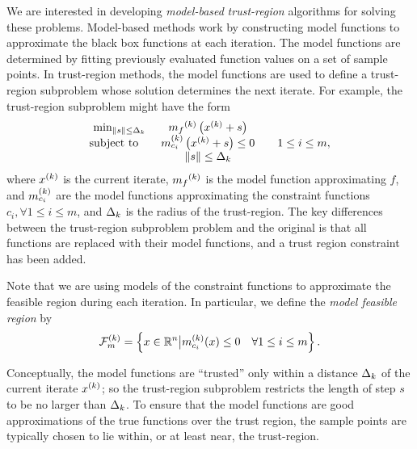 We are interested in developing {\em model-based} {\em trust-region} algorithms for solving these problems.
Model-based methods work by constructing model functions to approximate the black box functions at each iteration.
The model functions are determined by fitting previously evaluated function values on a set of sample points.
In trust-region methods, the model functions are used to define a trust-region subproblem whose solution determines the next iterate.
For example, the trust-region subproblem might have the form
\begin{align*}
\begin{array}{ccl} \min_{\|s\| \le \Delta_k}
 & {{m}_f}^{(k)} \left(x^{(k)}+s\right) \\
\mbox{subject to} \quad & {{m}^{(k)}_{c_i}}\left(x^{(k)} + s\right) \le 0 & \quad 1 \le i \le m, \\
& \|s\| \le \Delta_k \\
\end{array}
\end{align*}
where $x^{(k)}$ is the current iterate, ${{m}_f}^{(k)}$ is the model function approximating $f$, 
and ${{m}^{(k)}_{c_i}}$ are the model functions approximating the constraint functions $c_i, \forall 1 \le i \le m$, and $\Delta_k$ is the radius of the trust-region.
The key differences between the trust-region subproblem problem and the original is that all functions are replaced with their model functions, and a trust region constraint has been added.

Note that we are using models of the constraint functions to approximate the feasible region during each iteration.  In particular, we define the {\em model feasible region} by
\begin{align}
{\mathcal F_m^{(k)}} = \left\{x \in \mathbb R^n \big| {{m}^{(k)}_{c_i}}(x) \le 0 \quad \forall 1 \le i \le m \right\}.  \label{define_feasiblek}
\end{align}



Conceptually, the model functions are ``trusted'' only within a distance $ \Delta_k $ of the current iterate $x^{(k)}$; so the trust-region subproblem restricts the length of step $s$ to be no larger than $\Delta_k$.
To ensure that the model functions are good approximations of the true functions over the trust region, the sample points are typically chosen to lie within, or at least near, the trust-region.

